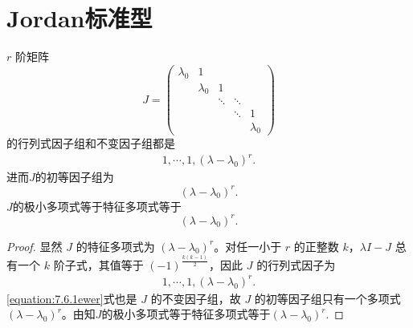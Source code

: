\documentclass[../../main.tex]{subfiles}%
\begin{document}
\section{Jordan标准型}

\begin{lemma}\label{lemma:Jordan块的初等因子组}
$r$ 阶矩阵
\[
J = \begin{pmatrix}
\lambda_0 & 1 & & & \\
& \lambda_0 & 1 & & \\
& & \ddots & \ddots & \\
& & & \ddots & 1 \\
& & & & \lambda_0
\end{pmatrix}
\]
的行列式因子组和不变因子组都是
\begin{align*}
1,\cdots,1,(\lambda - \lambda_0)^r.
\end{align*}
进而$J$的初等因子组为
$$
(\lambda - \lambda_0)^r.
$$
$J$的极小多项式等于特征多项式等于
$$
(\lambda - \lambda_0)^r.
$$
\end{lemma}
\begin{proof}
显然 $J$ 的特征多项式为 $(\lambda - \lambda_0)^r$。对任一小于 $r$ 的正整数 $k$，$\lambda I - J$ 总有一个 $k$ 阶子式，其值等于 $(-1)^{\frac{k(k-1)}{2}}$，因此 $J$ 的行列式因子为
\begin{align}
1,\cdots,1,(\lambda - \lambda_0)^r.
\label{equation:7.6.1ewer}
\end{align}
\eqref{equation:7.6.1ewer}式也是 $J$ 的不变因子组，故 $J$ 的初等因子组只有一个多项式 $(\lambda - \lambda_0)^r$。由知$J$的极小多项式等于特征多项式等于$(\lambda - \lambda_0)^r.$
\end{proof}
\end{document}

